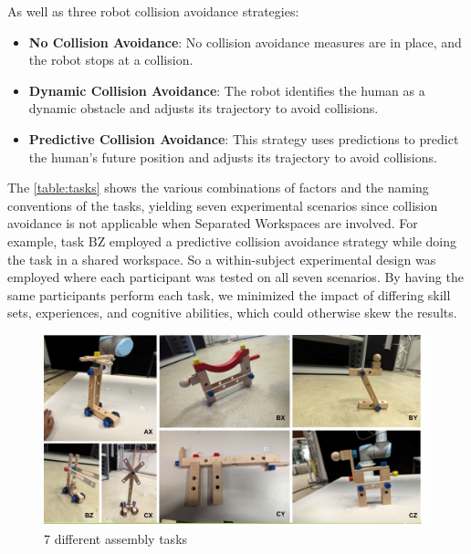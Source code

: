 As well as three robot collision avoidance strategies:

\begin{itemize}
    \item \textbf{No Collision Avoidance}:
    No collision avoidance measures are in place, and the robot stops at a collision.
    
    \item \textbf{Dynamic Collision Avoidance}:
    The robot identifies the human as a dynamic obstacle and adjusts its trajectory to avoid collisions.
    
    \item \textbf{Predictive Collision Avoidance}:
    This strategy uses predictions to predict the human's future position and adjusts its trajectory to avoid collisions.
\end{itemize}

The \autoref{table:tasks} shows the various combinations of factors and the naming conventions of the tasks, yielding seven experimental scenarios since collision avoidance is not applicable when Separated Workspaces are involved. For example, task BZ employed a predictive collision avoidance strategy while doing the task in a shared workspace. So a within-subject experimental design was employed where each participant was tested on all seven scenarios. By having the same participants perform each task, we minimized the impact of differing skill sets, experiences, and cognitive abilities, which could otherwise skew the results.

\begin{figure}[h]
	\centering
	\includegraphics[width=0.8\columnwidth]{images/tasks.drawio.pdf}
	\caption{7 different assembly tasks}
	\label{fig:task}
\end{figure}


